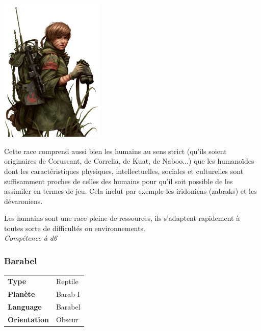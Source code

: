 \includegraphics[width=5cm]{img/races/humain.png} 

Cette race comprend aussi bien les humains au sens strict (qu’ils soient originaires de Coruscant, de Correlia, de Kuat, de Naboo...) que les humanoïdes dont les caractéristiques physiques, intellectuelles, sociales et culturelles sont suffisamment proches de celles des humains pour qu’il soit possible de les assimiler en termes de jeu. Cela inclut par exemple les iridoniens (zabraks) et les dévaroniens.

\begin{description}[align=left]
\item [Adaptabilité] 	%
	Les humains sont une race pleine de ressources, ils s'adaptent rapidement à toutes sorte de difficultés ou environnements.\\
	\emph{Compétence à d6}
\end{description}

\subsubsection{Barabel}

\begin{flushright}
\begin{tabular}{ l l }
	\textbf{Type} 			& Reptile \\
   	\textbf{Planète} 		& Barab I \\
   	\textbf{Language} 		& Barabel \\
   	\textbf{Orientation} 	& Obscur \\
\end{tabular}
\end{flushright}

